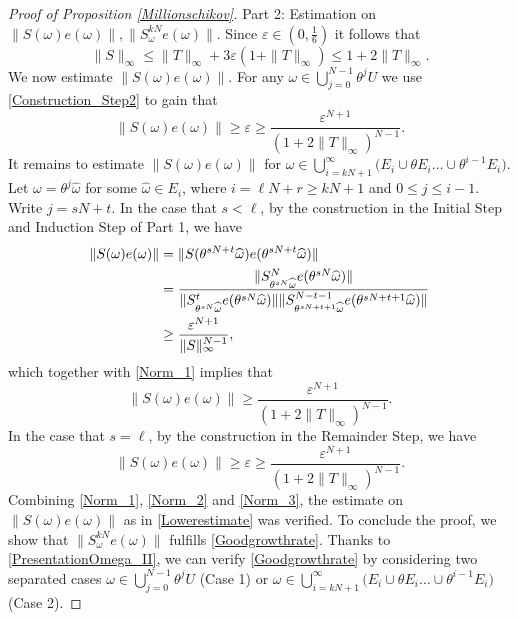 \documentclass[10pt,a4paper]{amsart}
\newcommand{\eps}{\varepsilon}
\begin{document}
\begin{proof}[Proof of Proposition \ref{Millionschikov}]
\noindent 
Part 2: Estimation on  $\|S(\omega)e(\omega)\|, \|S^{kN}_{\omega}e(\omega)\|$. Since $\eps\in (0,\frac{1}{6})$ it follows that 
\begin{equation}\label{BoundonS}
\|S\|_{\infty}\leq \|T\|_{\infty}+3\eps(1+\|T\|_{\infty})\leq 1 +2\|T\|_{\infty}.
\end{equation}
We now estimate $\|S(\omega)e(\omega)\|$. For any $\omega\in\bigcup_{j=0}^{N-1}\theta^jU$ we use \eqref{Construction_Step2} to gain that 
\begin{equation}\label{Norm_1}
\|S(\omega)e(\omega)\|
\geq \eps \geq \frac{\eps^{N+1}}{(1+2\|T\|_{\infty})^{N-1}}.
\end{equation}
It remains to estimate $\|S(\omega)e(\omega)\|$ for $\omega\in \bigcup_{i=kN+1}^{\infty}  \Big(E_i\cup \theta E_i\dots\cup\theta^{i-1} E_i\Big)$. Let $\omega=\theta^j \widehat\omega$ for some $\widehat\omega \in E_i$, where $i=\ell N+r \geq kN+1$ and $0\leq j\leq i-1$. Write $j=sN+t$. In the case that $s<\ell$,  by the construction in the Initial Step and Induction Step of Part 1, we have  
\begin{align*}
\|S(\omega)e(\omega)\|
&=\|S(\theta^{sN+t}\widehat\omega)e(\theta^{sN+t}\widehat\omega)\|\notag\\
&=\frac{\|S^N_{\theta^{sN}\widehat\omega}e(\theta^{sN}\widehat\omega)\|}{\|S^t_{\theta^{sN}\widehat\omega}e(\theta^{sN}\widehat\omega)\|\|S^{N-t-1}_{\theta^{sN+t+1}\widehat\omega}e(\theta^{sN+t+1}\widehat\omega)\|}\notag\\
&\geq  
\frac{\eps^{N+1}}{\|S\|_{\infty}^{N-1}},
\end{align*}
which together with \eqref{Norm_1} implies that
\begin{equation}\label{Norm_2}
\|S(\omega)e(\omega)\| 
\geq \frac{\eps^{N+1}}{(1+2\|T\|_{\infty})^{N-1}}.
\end{equation}
In the case that $s=\ell$, by the construction in the Remainder Step, we have 
\begin{equation}\label{Norm_3}
\|S(\omega)e(\omega)\|
\geq \eps \geq \frac{\eps^{N+1}}{(1+2\|T\|_{\infty})^{N-1}}.
\end{equation}
Combining \eqref{Norm_1}, \eqref{Norm_2} and \eqref{Norm_3}, the estimate on $\|S(\omega)e(\omega)\|$ as in  \eqref{Lowerestimate} was verified. To conclude the proof, we show that $\|S^{kN}_{\omega}e(\omega)\|$ fulfills  \eqref{Goodgrowthrate}. Thanks to \eqref{PresentationOmega_II}, we can verify \eqref{Goodgrowthrate} by considering  two separated cases $\omega\in  \bigcup_{j=0}^{N-1}\theta^j U$ (Case 1) or $\omega\in \bigcup_{i=kN+1}^{\infty}  \Big(E_i\cup \theta E_i\dots\cup\theta^{i-1} E_i\Big)$ (Case 2).


\end{proof}
\end{document}
